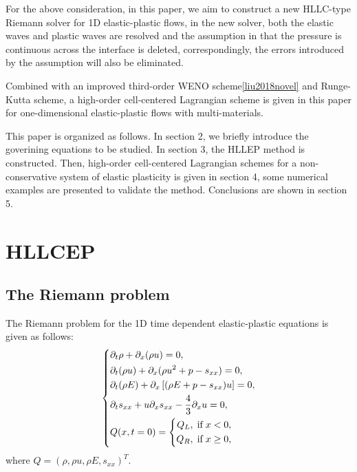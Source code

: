 \documentclass{article}
\numberwithin{equation}{section}
\numberwithin{table}{section}
\begin{document}
For the above consideration, in this paper, we aim to construct a new HLLC-type Riemann solver for 1D elastic-plastic flows, in the new solver, both the elastic waves and plastic waves are resolved and the assumption in \cite{cheng2016harten} that the pressure is continuous across the interface is deleted, correspondingly, the errors introduced by the assumption will also be eliminated.

Combined with an improved third-order WENO scheme\ref{liu2018novel} and Runge-Kutta scheme, a high-order cell-centered Lagrangian scheme is given in this paper for one-dimensional elastic-plastic flows with multi-materials. 

This paper is organized as follows. In section 2, we briefly introduce the goverining equations to be studied. In section 3, the HLLEP method is constructed.  Then, high-order cell-centered Lagrangian schemes for a non-conservative system of elastic plasticity is given in section 4, some numerical examples are presented to validate the method.  Conclusions are shown in section 5.

\section{HLLCEP}\label{sec:HLLCEP}
\subsection{The Riemann problem}

The Riemann problem for the 1D time dependent elastic-plastic equations is given as follows:
 \begin{equation}\label{eq:1d}
   \left\{ \begin{aligned}
	   & \partial _t \rho +\partial_x(\rho u)=0,\\
	   & \partial _t (\rho u)+\partial_x(\rho u^2 + p -s_{xx})=0,\\
	   &\partial _t (\rho E)+\partial_x\left[(\rho E + p -s_{xx})u\right]=0,\\
	   &\partial _t s_{xx}+u\partial_xs_{xx}-\frac{4}{3}\partial_x u=0,\\
	   &Q(x,t = 0) = \left\{\begin{aligned}
		   Q_L, \hspace{0.1cm} \text{if} \hspace{0.1cm} x<0, \\
		   Q_R, \hspace{0.1cm} \text{if} \hspace{0.1cm} x\ge 0, \\
	   \end{aligned}\right.
	 \end{aligned}
  \right.
\end{equation}
where $Q = (\rho, \rho u, \rho E, s_{xx})^T$.
\end{document}
